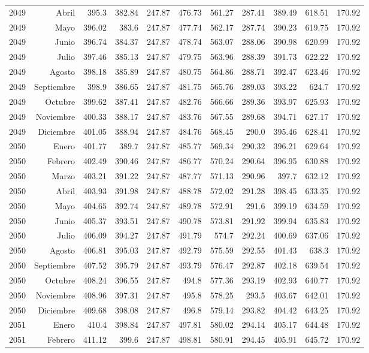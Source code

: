 \documentclass{article}%
\begin{document}
\begin{longtable}{|l r|r|r|r|r|r|r|r|r|r|}
2049&Abril&395.3&382.84&247.87&476.73&561.27&287.41&389.49&618.51&170.92\\%
2049&Mayo&396.02&383.6&247.87&477.74&562.17&287.74&390.23&619.75&170.92\\%
2049&Junio&396.74&384.37&247.87&478.74&563.07&288.06&390.98&620.99&170.92\\%
2049&Julio&397.46&385.13&247.87&479.75&563.96&288.39&391.73&622.22&170.92\\%
2049&Agosto&398.18&385.89&247.87&480.75&564.86&288.71&392.47&623.46&170.92\\%
2049&Septiembre&398.9&386.65&247.87&481.75&565.76&289.03&393.22&624.7&170.92\\%
2049&Octubre&399.62&387.41&247.87&482.76&566.66&289.36&393.97&625.93&170.92\\%
2049&Noviembre&400.33&388.17&247.87&483.76&567.55&289.68&394.71&627.17&170.92\\%
2049&Diciembre&401.05&388.94&247.87&484.76&568.45&290.0&395.46&628.41&170.92\\%
2050&Enero&401.77&389.7&247.87&485.77&569.34&290.32&396.21&629.64&170.92\\%
2050&Febrero&402.49&390.46&247.87&486.77&570.24&290.64&396.95&630.88&170.92\\%
2050&Marzo&403.21&391.22&247.87&487.77&571.13&290.96&397.7&632.12&170.92\\%
2050&Abril&403.93&391.98&247.87&488.78&572.02&291.28&398.45&633.35&170.92\\%
2050&Mayo&404.65&392.74&247.87&489.78&572.91&291.6&399.19&634.59&170.92\\%
2050&Junio&405.37&393.51&247.87&490.78&573.81&291.92&399.94&635.83&170.92\\%
2050&Julio&406.09&394.27&247.87&491.79&574.7&292.24&400.69&637.06&170.92\\%
2050&Agosto&406.81&395.03&247.87&492.79&575.59&292.55&401.43&638.3&170.92\\%
2050&Septiembre&407.52&395.79&247.87&493.79&576.47&292.87&402.18&639.54&170.92\\%
2050&Octubre&408.24&396.55&247.87&494.8&577.36&293.19&402.93&640.77&170.92\\%
2050&Noviembre&408.96&397.31&247.87&495.8&578.25&293.5&403.67&642.01&170.92\\%
2050&Diciembre&409.68&398.08&247.87&496.8&579.14&293.82&404.42&643.25&170.92\\%
2051&Enero&410.4&398.84&247.87&497.81&580.02&294.14&405.17&644.48&170.92\\%
2051&Febrero&411.12&399.6&247.87&498.81&580.91&294.45&405.91&645.72&170.92\\%

\end{longtable}
\end{document}
